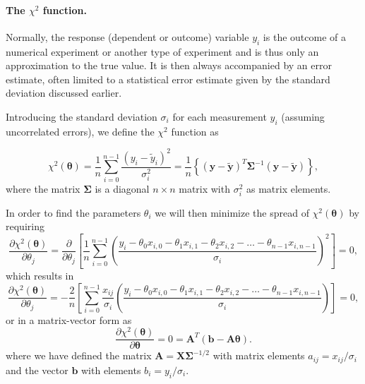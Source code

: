 \documentclass[%
oneside,                 %
final,                   %
10pt]{article}
\newenvironment{block_mdfboxadmon}[1][]{
\begin{block_mdfboxmdframed}[frametitle=#1]
}
{
\end{block_mdfboxmdframed}
}
\begin{document}
\paragraph{The $\chi^2$ function.}

\begin{block_mdfboxadmon}[]

Normally, the response (dependent or outcome) variable $y_i$ is the
outcome of a numerical experiment or another type of experiment and is
thus only an approximation to the true value. It is then always
accompanied by an error estimate, often limited to a statistical error
estimate given by the standard deviation discussed earlier. 

Introducing the standard deviation $\sigma_i$ for each measurement
$y_i$ (assuming uncorrelated errors), we define the $\chi^2$ function as

\[
\chi^2(\bm{\theta})=\frac{1}{n}\sum_{i=0}^{n-1}\frac{\left(y_i-\tilde{y}_i\right)^2}{\sigma_i^2}=\frac{1}{n}\left\{\left(\bm{y}-\bm{\tilde{y}}\right)^T \bm{\Sigma}^{-1}\left(\bm{y}-\bm{\tilde{y}}\right)\right\},
\]
where the matrix $\bm{\Sigma}$ is a diagonal $n \times n$ matrix with $\sigma_i^2$ as matrix elements.
\end{block_mdfboxadmon} %




\begin{block_mdfboxadmon}[]

In order to find the parameters $\theta_i$ we will then minimize the spread of $\chi^2(\bm{\theta})$ by requiring
\[
\frac{\partial \chi^2(\bm{\theta})}{\partial \theta_j} = \frac{\partial }{\partial \theta_j}\left[ \frac{1}{n}\sum_{i=0}^{n-1}\left(\frac{y_i-\theta_0x_{i,0}-\theta_1x_{i,1}-\theta_2x_{i,2}-\dots-\theta_{n-1}x_{i,n-1}}{\sigma_i}\right)^2\right]=0, 
\]
which results in
\[
\frac{\partial \chi^2(\bm{\theta})}{\partial \theta_j} = -\frac{2}{n}\left[ \sum_{i=0}^{n-1}\frac{x_{ij}}{\sigma_i}\left(\frac{y_i-\theta_0x_{i,0}-\theta_1x_{i,1}-\theta_2x_{i,2}-\dots-\theta_{n-1}x_{i,n-1}}{\sigma_i}\right)\right]=0, 
\]
or in a matrix-vector form as
\[
\frac{\partial \chi^2(\bm{\theta})}{\partial \bm{\theta}} = 0 = \bm{A}^T\left( \bm{b}-\bm{A}\bm{\theta}\right).  
\]
where we have defined the matrix $\bm{A} =\bm{X} \bm{\Sigma}^{-1/2}$ with matrix elements $a_{ij} = x_{ij}/\sigma_i$ and the vector $\bm{b}$ with elements $b_i = y_i/\sigma_i$.
\end{block_mdfboxadmon} %
\end{document}
